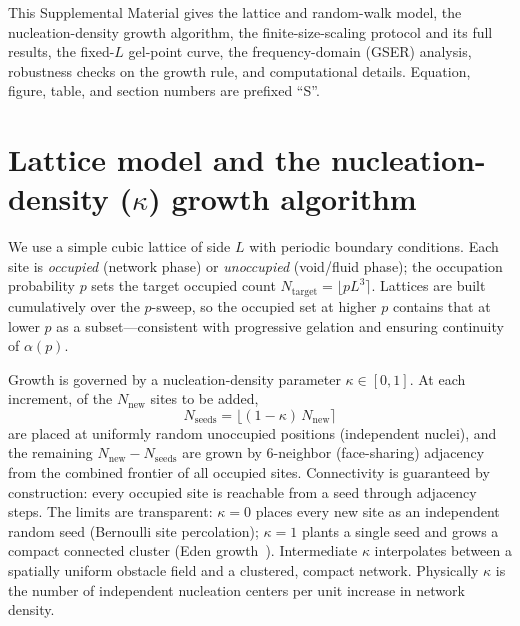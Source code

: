 \documentclass[aps,prl,twocolumn,superscriptaddress,floatfix,nofootinbib]{revtex4-2}
\newcommand{\kap}{\kappa}
\begin{document}
\noindent This Supplemental Material gives the lattice and random-walk model, the nucleation-density
growth algorithm, the finite-size-scaling protocol and its full results, the fixed-$L$ gel-point
curve, the frequency-domain (GSER) analysis, robustness checks on the growth rule, and
computational details. Equation, figure, table, and section numbers are prefixed ``S''.

\section{Lattice model and the nucleation-density ($\kap$) growth algorithm}
We use a simple cubic lattice of side $L$ with periodic boundary conditions. Each site is
\emph{occupied} (network phase) or \emph{unoccupied} (void/fluid phase); the occupation
probability $p$ sets the target occupied count $N_{\mathrm{target}}=\lfloor pL^3\rceil$. Lattices
are built cumulatively over the $p$-sweep, so the occupied set at higher $p$ contains that at
lower $p$ as a subset---consistent with progressive gelation and ensuring continuity of $\alpha(p)$.

Growth is governed by a nucleation-density parameter $\kap\in[0,1]$. At each increment, of the
$N_{\mathrm{new}}$ sites to be added,
\begin{equation}
  N_{\mathrm{seeds}}=\big\lfloor(1-\kap)\,N_{\mathrm{new}}\big\rceil
\end{equation}
are placed at uniformly random unoccupied positions (independent nuclei), and the remaining
$N_{\mathrm{new}}-N_{\mathrm{seeds}}$ are grown by 6-neighbor (face-sharing) adjacency from the
combined frontier of all occupied sites. Connectivity is guaranteed by construction: every
occupied site is reachable from a seed through adjacency steps. The limits are transparent:
$\kap=0$ places every new site as an independent random seed (Bernoulli site percolation);
$\kap=1$ plants a single seed and grows a compact connected cluster (Eden growth~\cite{Eden1961}).
Intermediate $\kap$ interpolates between a spatially uniform obstacle field and a clustered,
compact network. Physically $\kap$ is the number of independent nucleation centers per unit
increase in network density.
\end{document}
